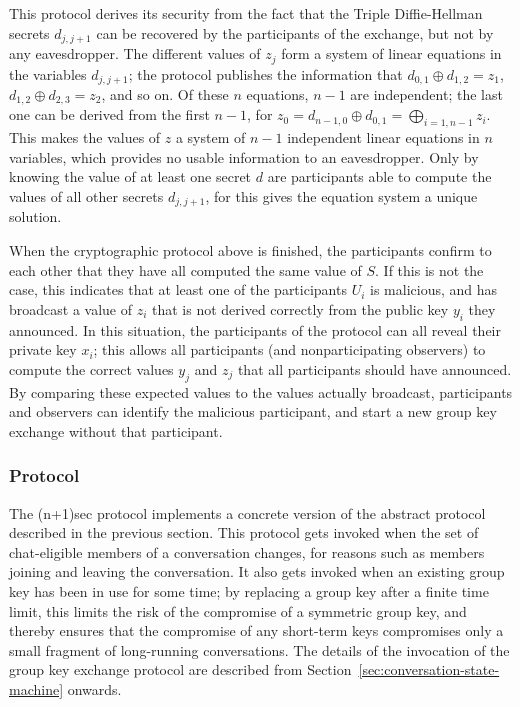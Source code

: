 \documentclass{article}
\def\xor{\oplus}
\begin{document}
This protocol derives its security from the fact that the Triple Diffie-Hellman secrets $d_{j, j+1}$ can be recovered by the participants of the exchange, but not by any eavesdropper.
The different values of $z_j$ form a system of linear equations in the variables $d_{j, j+1}$; the protocol publishes the information that $d_{0, 1} \xor d_{1, 2} = z_{1}$, $d_{1, 2} \xor d_{2, 3} = z_2$, and so on.
Of these $n$ equations, $n - 1$ are independent; the last one can be derived from the first $n - 1$, for $z_0 = d_{n-1, 0} \xor d_{0, 1} = \bigoplus_{i=1, n-1} z_i$.
This makes the values of $z$ a system of $n - 1$ independent linear equations in $n$ variables, which provides no usable information to an eavesdropper.
Only by knowing the value of at least one secret $d$ are participants able to compute the values of all other secrets $d_{j, j+1}$, for this gives the equation system a unique solution.

When the cryptographic protocol above is finished, the participants confirm to each other that they have all computed the same value of $S$.
If this is not the case, this indicates that at least one of the participants $U_i$ is malicious, and has broadcast a value of $z_i$ that is not derived correctly from the public key $y_i$ they announced.
In this situation, the participants of the protocol can all reveal their private key $x_i$; this allows all participants (and nonparticipating observers) to compute the correct values $y_j$ and $z_j$ that all participants should have announced.
By comparing these expected values to the values actually broadcast, participants and observers can identify the malicious participant, and start a new group key exchange without that participant.


\subsubsection{Protocol}
\label{sec:cryptography/group-key-exchange/protocol}

The (n+1)sec protocol implements a concrete version of the abstract protocol described in the previous section.
This protocol gets invoked when the set of chat-eligible members of a conversation changes, for reasons such as members joining and leaving the conversation.
It also gets invoked when an existing group key has been in use for some time; by replacing a group key after a finite time limit, this limits the risk of the compromise of a symmetric group key, and thereby ensures that the compromise of any short-term keys compromises only a small fragment of long-running conversations.
The details of the invocation of the group key exchange protocol are described from Section~\ref{sec:conversation-state-machine} onwards.
\end{document}
